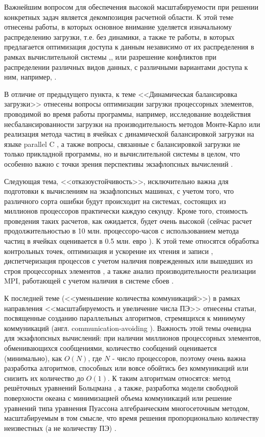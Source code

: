  Важнейшим вопросом для обеспечения высокой масштабируемости при решении конкретных задач является декомпозиция расчетной области. К этой теме отнесены работы, в которых основное внимание уделяется изначальному распределению загрузки, т.е. без динамики, а также те работы, в которых предлагается оптимизация доступа к данным независимо от их распределения в рамках вычислительной системы \cite{Srinivasa2012256},\cite{Lieb2014246}, или разрешение конфликтов при распределении различных видов данных, с различными вариантами доступа к ним, например, \cite{Sitaraman2016,Balzuweit201667}.

В отличие от предыдущего пункта, к теме <<Динамическая балансировка загрузки>> отнесены вопросы оптимизации загрузки процессорных элементов, проводимой во время работы программы, например, исследование воздействия несбалансированности загрузки на производительность методов Монте-Карло \cite{Siegel2013901} или реализация метода частиц в ячейках с динамической балансировкой загрузки на языке parallel C \cite{Verleye201310}, а также вопросы, связанные с балансировкой загрузки не только прикладной программы, но и вычислительной системы в целом, что особенно важно с точки зрения перспективы экзафлопсных вычислений \cite{Dong20121254}.



Следующая тема, <<отказоустойчивость>>, исключительно важна для подготовки к вычислениям на экзафлопсных машинах,
с учетом того, что различного сорта ошибки будут происходит на системах, состоящих из миллионов процессоров практически каждую секунду. Кроме того, стоимость проведения таких расчетов, как ожидается, будет очень высокой (сейчас расчет продолжительностью в 10 млн. процессоро-часов с использованием метода частиц в ячейках оценивается в 0.5 млн. евро \cite{Vieira}). К этой теме относятся
обработка контрольных точек, оптимизация и ускорение их чтения и записи \cite{Nicolae2013698,Casanova20157}, диспетчеризация процессов с учетом наличия поврежденных или вышедших из строя процессорных элементов \cite{Defour20161},
а также анализ производительности реализации MPI, работающей с учетом наличия в системе сбоев \cite{Hursey201215}.

К последней теме (<<уменьшение количества коммуникаций>>) в рамках направления <<масштабируемость и увеличение числа ПЭ>> отнесены статьи, посвященные созданию параллельных алгоритмов, стремящихся к минимуму коммуникаций (англ. communication-avoiding \cite{Dongarra2013212}). Важность этой темы очевидна для экзафлопсных вычислений: при наличии миллионов процессорных элементов, обменивающихся сообщениями, количество сообщений оценивается (минимально), как $O(N)$, где $N$ - число процессоров, поэтому очень важна разработка алгоритмов, способных или вовсе обойтись без коммуникаций или снизить их количество до $O(1)$. К таким алгоритмам относятся: метод решёточных уравнений Больцмана \cite{Wittmann2013924,Safi2016170}, а также, разработка модели свободной поверхности океана с минимизацией объема коммуникаций\cite{Newman2016877} или решение уравнений типа уравнения Пуассона алгебраическим многосеточным методом, масштабируемым в том смысле, что время решения пропорционально количеству неизвестных (а не количеству ПЭ) \cite{Notay2015237}.

